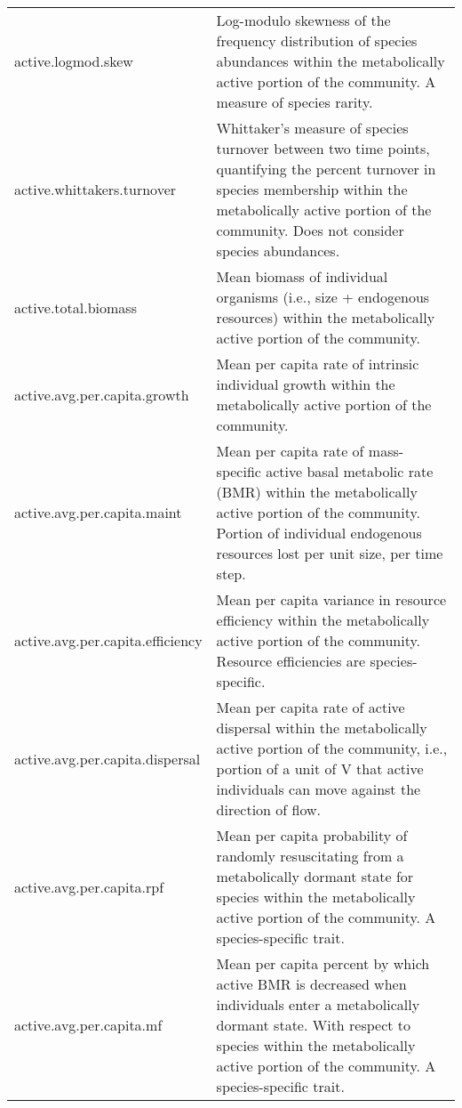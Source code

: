 \documentclass[12pt]{article}
\begin{document}
\begin{longtable}{| p{} | p{} |}
active.logmod.skew & Log-modulo skewness of the frequency distribution of species abundances within the metabolically active portion of the community. A measure of species rarity. \\[6pt]

active.whittakers.turnover & Whittaker's measure of species turnover between two time points, quantifying the percent turnover in species membership within the metabolically active portion of the community. Does not consider species abundances. \\[6pt]

active.total.biomass & Mean biomass of individual organisms (i.e., size + endogenous resources) within the metabolically active portion of the community. \\[6pt]

active.avg.per.capita.growth & Mean per capita rate of intrinsic individual growth within the metabolically active portion of the community. \\[6pt]

active.avg.per.capita.maint & Mean per capita rate of mass-specific active basal metabolic rate (BMR) within the metabolically active portion of the community. Portion of individual endogenous resources lost per unit size, per time step. \\[6pt]

active.avg.per.capita.efficiency & Mean per capita variance in resource efficiency within the metabolically active portion of the community. Resource efficiencies are species-specific. \\[6pt]

active.avg.per.capita.dispersal & Mean per capita rate of active dispersal within the metabolically active portion of the community, i.e., portion of a unit of V that active individuals can move against the direction of flow. \\[6pt]

active.avg.per.capita.rpf & Mean per capita probability of randomly resuscitating from a metabolically dormant state for species within the metabolically active portion of the community. A species-specific trait. \\[6pt]

active.avg.per.capita.mf & Mean per capita percent by which active BMR is decreased when individuals enter a metabolically dormant state. With respect to species within the metabolically active portion of the community. A species-specific trait. \\[6pt]


\end{longtable}
\end{document}
